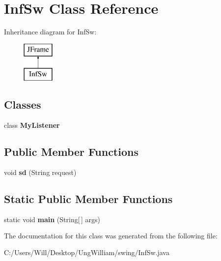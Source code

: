 \hypertarget{class_inf_sw}{}\section{Inf\+Sw Class Reference}
\label{class_inf_sw}
Inheritance diagram for Inf\+Sw\+:\begin{figure}[H]
\begin{center}
\leavevmode
\includegraphics[height=2.000000cm]{class_inf_sw}
\end{center}
\end{figure}
\subsection*{Classes}
\begin{DoxyCompactItemize}
\item 
class {\bfseries My\+Listener}
\end{DoxyCompactItemize}
\subsection*{Public Member Functions}
\begin{DoxyCompactItemize}
\item 
void {\bfseries sd} (String request)\hypertarget{class_inf_sw_ab76e623fd1c57c5e806d66acbf37d2f3}{}\label{class_inf_sw_ab76e623fd1c57c5e806d66acbf37d2f3}

\end{DoxyCompactItemize}
\subsection*{Static Public Member Functions}
\begin{DoxyCompactItemize}
\item 
static void {\bfseries main} (String\mbox{[}$\,$\mbox{]} args)\hypertarget{class_inf_sw_a6e489351c2dc1dcb6fcaa30c9c41d5fb}{}\label{class_inf_sw_a6e489351c2dc1dcb6fcaa30c9c41d5fb}

\end{DoxyCompactItemize}


The documentation for this class was generated from the following file\+:\begin{DoxyCompactItemize}
\item 
C\+:/\+Users/\+Will/\+Desktop/\+Ung\+William/swing/Inf\+Sw.\+java\end{DoxyCompactItemize}
